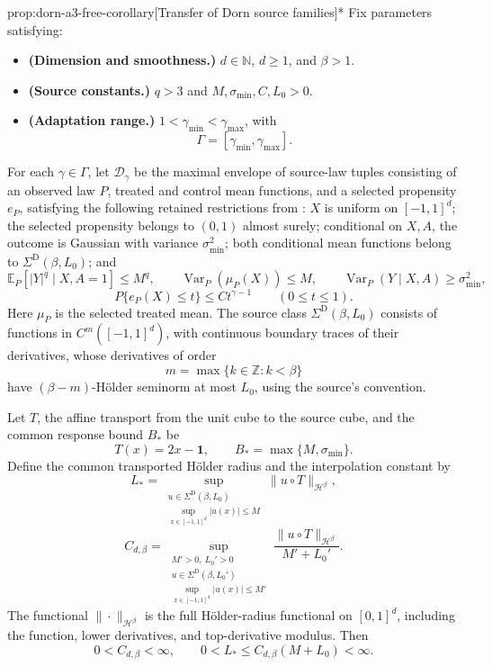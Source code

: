 \begin{propositionv}{prop:dorn-a3-free-corollary}[Transfer of Dorn source families]*
Fix parameters satisfying:
\begin{itemize}
\item \textbf{(Dimension and smoothness.)} \(d\in\mathbb N\), \(d\ge1\), and \(\beta>1\).
\item \textbf{(Source constants.)} \(q>3\) and \(M,\sigma_{\min},C,L_0>0\).
\item \textbf{(Adaptation range.)} \(1<\gamma_{\min}<\gamma_{\max}\), with
\[
\Gamma=[\gamma_{\min},\gamma_{\max}].
\]
\end{itemize}

For each \(\gamma\in\Gamma\), let \(\mathcal D_\gamma\) be the maximal envelope of source-law tuples consisting of an observed law \(P\), treated and control mean functions, and a selected propensity \(e_P\), satisfying the following retained restrictions from \citet[Section 2, Assumptions 1--2, pp.~3--7]{Dorn2026GlobalOverlap}: \(X\) is uniform on \([-1,1]^d\); the selected propensity belongs to \((0,1)\) almost surely; conditional on \(X,A\), the outcome is Gaussian with variance \(\sigma_{\min}^2\); both conditional mean functions belong to \(\Sigma^{\mathrm D}(\beta,L_0)\); and
\[
\mathbb E_P\!\left[|Y|^q\mid X,A=1\right]\le M^q,
\qquad
\operatorname{Var}_P(\mu_P(X))\le M,
\qquad
\operatorname{Var}_P(Y\mid X,A)\ge\sigma_{\min}^2,
\]
\[
P\{e_P(X)\le t\}\le Ct^{\gamma-1}
\qquad (0\le t\le1).
\]
Here \(\mu_P\) is the selected treated mean. The source class \(\Sigma^{\mathrm D}(\beta,L_0)\) consists of functions in \(C^m([-1,1]^d)\), with continuous boundary traces of their derivatives, whose derivatives of order
\[
m=\max\{k\in\mathbb Z:k<\beta\}
\]
have \((\beta-m)\)-Hölder seminorm at most \(L_0\), using the source's convention.

Let \(T\), the affine transport from the unit cube to the source cube, and the common response bound \(B_*\) be
\[
T(x)=2x-\mathbf1,
\qquad
B_*=\max\{M,\sigma_{\min}\}.
\]
Define the common transported Hölder radius and the interpolation constant by
\[
L_*=
\sup_{\substack{u\in\Sigma^{\mathrm D}(\beta,L_0)\\
                 \sup_{x\in[-1,1]^d}|u(x)|\le M}}
\|u\circ T\|_{\mathcal H^\beta},
\]
\[
C_{d,\beta}=
\sup_{\substack{M'>0,\ L_0'>0\\
                 u\in\Sigma^{\mathrm D}(\beta,L_0')\\
                 \sup_{x\in[-1,1]^d}|u(x)|\le M'}}
\frac{\|u\circ T\|_{\mathcal H^\beta}}{M'+L_0'}.
\]
The functional \(\|\cdot\|_{\mathcal H^\beta}\) is the full Hölder-radius functional on \([0,1]^d\), including the function, lower derivatives, and top-derivative modulus. Then
\[
0<C_{d,\beta}<\infty,
\qquad
0<L_*\le C_{d,\beta}(M+L_0)<\infty.
\]


\end{propositionv}
